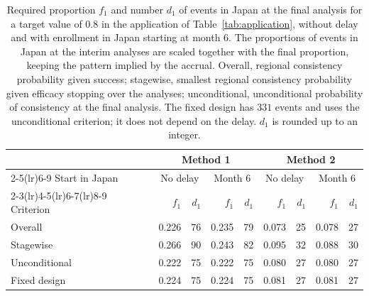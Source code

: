 \begin{table}[ht]
\centering
\footnotesize
\caption{Required proportion $f_{1}$ and number $d_{1}$ of events in Japan at the final analysis for a target value of 0.8 in the application of Table~\ref{tab:application}, without delay and with enrollment in Japan starting at month 6. The proportions of events in Japan at the interim analyses are scaled together with the final proportion, keeping the pattern implied by the accrual. Overall, regional consistency probability given success; stagewise, smallest regional consistency probability given efficacy stopping over the analyses; unconditional, unconditional probability of consistency at the final analysis. The fixed design has $331$ events and uses the unconditional criterion; it does not depend on the delay. $d_{1}$ is rounded up to an integer.}
\label{tab:required}
\begin{tabular}{l rrrr rrrr}
\toprule
& \multicolumn{4}{c}{Method 1} & \multicolumn{4}{c}{Method 2} \\
\cmidrule(lr){2-5}\cmidrule(lr){6-9}
Start in Japan & \multicolumn{2}{c}{No delay} & \multicolumn{2}{c}{Month 6} & \multicolumn{2}{c}{No delay} & \multicolumn{2}{c}{Month 6} \\
\cmidrule(lr){2-3}\cmidrule(lr){4-5}\cmidrule(lr){6-7}\cmidrule(lr){8-9}
Criterion & $f_{1}$ & $d_{1}$ & $f_{1}$ & $d_{1}$ & $f_{1}$ & $d_{1}$ & $f_{1}$ & $d_{1}$ \\
\midrule
Overall & 0.226 & 76 & 0.235 & 79 & 0.073 & 25 & 0.078 & 27 \\
Stagewise & 0.266 & 90 & 0.243 & 82 & 0.095 & 32 & 0.088 & 30 \\
Unconditional & 0.222 & 75 & 0.222 & 75 & 0.080 & 27 & 0.080 & 27 \\
Fixed design & 0.224 & 75 & 0.224 & 75 & 0.081 & 27 & 0.081 & 27 \\
\bottomrule
\end{tabular}
\end{table}
